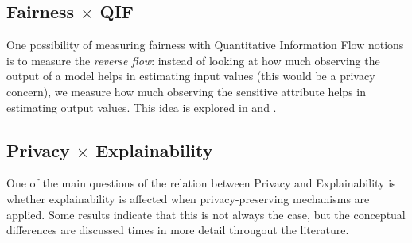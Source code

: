 \subsection{Fairness $\times$ QIF}

One possibility of measuring fairness with Quantitative Information Flow notions is to measure the \emph{reverse flow}: instead of looking at how much observing the output of a model helps in estimating input values (this would be a privacy concern), we measure how much observing the sensitive attribute helps in estimating output values. This idea is explored in \cite{On the duality of privacy and fairness} and \cite{On the relation of privacy and fairness through the lenses of quantitative information flow}.

\subsection{Privacy $\times$ Explainability}

One of the main questions of the relation between Privacy and Explainability is whether explainability is affected when privacy-preserving mechanisms are applied. Some results indicate that this is not always the case, but the conceptual differences are discussed times in more detail througout the literature. 


